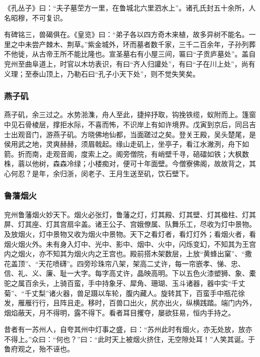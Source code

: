\documentclass[]{article}
\begin{document}
《孔丛子》曰：``夫子墓茔方一里，在鲁城北六里泗水上''。诸孔氏封五十余所，人名昭穆，不可复识。

有碑铭三，兽碣俱在。《皇览》曰：``弟子各以四方奇木来植，故多异树不能名。一里之中未尝产棘木、荆草。''紫金城外，环而墓者数千家，三千二百余年，子孙列葬不他徙，从古帝王所不能比隆也。宣圣墓右有小屋三间，匾曰``子贡庐墓处''。盖自兖州至曲阜道上，时官以木坊表识，有曰``齐人归讙处''，有曰``子在川上处''，尚有义理；至泰山顶上，乃勒石曰``孔子小天下处''，则不觉失笑矣。

\hypertarget{header-n112}{%
\subsubsection{燕子矶}\label{header-n112}}

燕子矶，余三过之。水势湁潗，舟人至此，捷捽抒取，钩挽铁缆，蚁附而上。篷窗中见石骨棱层，撑拒水际，不喜而怖，不识岸上有如许境界。戊寅到京后，同吕吉士出观音门，游燕子矶。方晓佛地仙都，当面蹉过之矣。登关王殿，吴头楚尾，是侯用武之地，灵爽赫赫，须眉戟起。缘山走矶上，坐亭子，看江水潎洌，舟下如箭。折而南，走观音阁，度索上之。阁旁僧院，有峭壁千寻，碚礌如铁；大枫数株，蓊以他树，森森冷绿；小楼痴对，便可十年面壁。今僧寮佛阁，故故背之，其心何忍？是年，余归浙，闵老子、王月生送至矶，饮石壁下。

\hypertarget{header-n117}{%
\subsubsection{鲁藩烟火}\label{header-n117}}

兖州鲁藩烟火妙天下。烟火必张灯，鲁藩之灯，灯其殿、灯其壁、灯其楹柱、灯其屏、灯其座、灯其宫扇伞盖。诸王公子、宫娥僚属、队舞乐工，尽收为灯中景物。及放烟火，灯中景物又收为烟火中景物。天下之看灯者，看灯灯外；看烟火者，看烟火烟火外。未有身入灯中、光中、影中、烟中、火中，闪烁变幻，不知其为王宫内之烟火，亦不知其为烟火内之王宫也。殿前搭木架数层，上放``黄蜂出窠''、``撒花盖顶''、``天花喷礴''。四旁珍珠帘八架，架高二丈许，每一帘嵌孝、悌、忠、信、礼、义、廉、耻一大字。每字高丈许，晶映高明。下以五色火漆塑狮、象、橐驼之属百余头，上骑百蛮，手中持象牙、犀角、珊瑚、玉斗诸器，器中实``千丈菊''、``千丈梨''诸火器，兽足蹑以车轮，腹内藏人。旋转其下，百蛮手中瓶花徐发，雁雁行行，且阵且走。移时，百兽口出火，尻亦出火，纵横践踏。端门内外，烟焰蔽天，月不得明，露不得下。看者耳目攫夺，屡欲狂易，恒内手持之。

昔者有一苏州人，自夸其州中灯事之盛，曰：``苏州此时有烟火，亦无处放，放亦不得上。''众曰：``何也？''曰：``此时天上被烟火挤住，无空隙处耳！''人笑其诞。于鲁府观之，殆不诬也。
\end{document}
